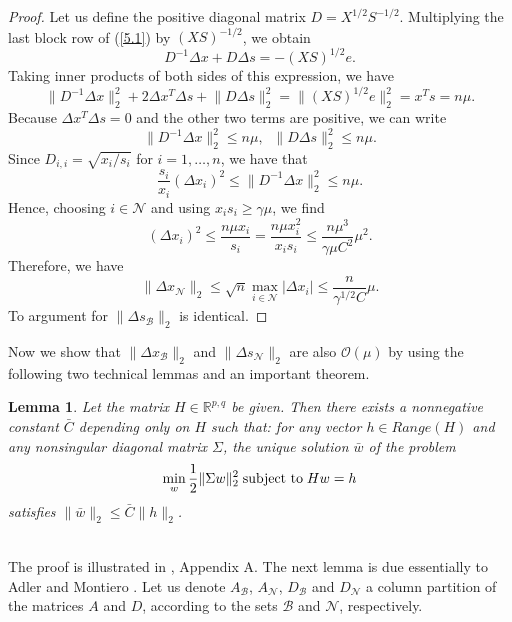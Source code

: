 \documentclass[a4paper,10 pt,titlepage,twoside]{book}
\theoremstyle{plain}
\newtheorem{lem}[thm]{Lemma}
\theoremstyle{definition}
\theoremstyle{remark}
\begin{document}
\begin{proof}
	Let us define the positive diagonal matrix $D = X^{1/2}S^{-1/2}$. Multiplying the last block row of (\ref{5.1}) by $(XS)^{-1/2}$, we obtain 
	\begin{equation*}
	D^{-1}\Delta x + D \Delta s = -(XS)^{1/2}e.
	\end{equation*}
	Taking inner products of both sides of this expression, we have
	\begin{equation*}
	\lVert D^{-1}\Delta x \rVert^{2}_{2} + 2\Delta x^{T}\Delta s+ \lVert D\Delta s \rVert^{2}_{2}= \lVert(XS)^{1/2}e\rVert^{2}_{2}= x^{T}s= n\mu.
	\end{equation*}
	Because $\Delta x^{T}\Delta s= 0$ and the other two terms are positive, we can write
	\begin{equation*}
	\lVert D^{-1}\Delta x\rVert^{2}_{2}\leq n\mu, \;\;\lVert D\Delta s\rVert^{2}_{2}\leq n\mu.
	\end{equation*}
	Since $D_{i,i}= \sqrt{x_{i}/s_{i}}$ for $i=1,\dots,n$, we have that
	\begin{equation*}
	\frac{s_{i}}{x_{i}}(\Delta x_{i})^{2}\leq\lVert D^{-1}\Delta x\rVert^{2}_{2}\leq n\mu.
	\end{equation*}
	Hence, choosing $i\in\mathcal{N}$ and using $x_{i}s_{i}\geq\gamma\mu$, we find
	\begin{equation*}
	(\Delta x_{i})^{2}\leq\frac{n\mu x_{i}}{s_{i}}=\frac{n\mu x_{i}^{2}}{x_{i}s_{i}}\leq\frac{n\mu^{3}}{\gamma\mu C^{2}}\mu^{2}.
	\end{equation*}
	Therefore, we have 
	\begin{equation*}
	\lVert \Delta x_{\mathcal{N}}\rVert_{2} \leq \sqrt{n}\max\limits_{i \in \mathcal{N}}|\Delta x_{i}|\leq\frac{n}{\gamma^{1/2}C}\mu.
	\end{equation*}
	To argument for $\lVert \Delta s_{\mathcal{B}}\rVert_{2}$ is identical.
\end{proof}
Now we show that $\lVert \Delta x_{\mathcal{B}}\rVert_{2}$ and $\lVert \Delta s_{\mathcal{N}}\rVert_{2}$ are also $\mathcal{O}(\mu)$ by using the following two technical lemmas and an important theorem.
\begin{lem} \label{(T)}
	Let the matrix $H\in\mathbb{R}^{p,q}$ be given. Then there exists a nonnegative constant $\bar{C}$ depending only on $H$ such that: for any vector $h\in Range(H)$ and any nonsingular diagonal matrix $\Sigma$, the unique solution $\bar{w}$ of the problem
	\begin{align*}
	\min\limits_{w}\frac{1}{2}\lVert\Sigma w\rVert^{2}_{2} \text{\;subject to\;} Hw = h
	\end{align*}
	satisfies $\lVert\bar{w}\rVert_{2}\leq \bar{C}\lVert h\rVert_{2}$.
\end{lem}\\
The proof is illustrated in \cite{Wright}, Appendix A.
The next lemma is due essentially to Adler and Montiero \cite{ADL}.  Let us denote $A_{\mathcal{B}}$, $A_{\mathcal{N}}$, $D_{\mathcal{B}}$ and $D_{\mathcal{N}}$ a column partition of the matrices $A$ and $D$, according to the sets $\mathcal{B}$ and $\mathcal{N}$, respectively.
\end{document}

